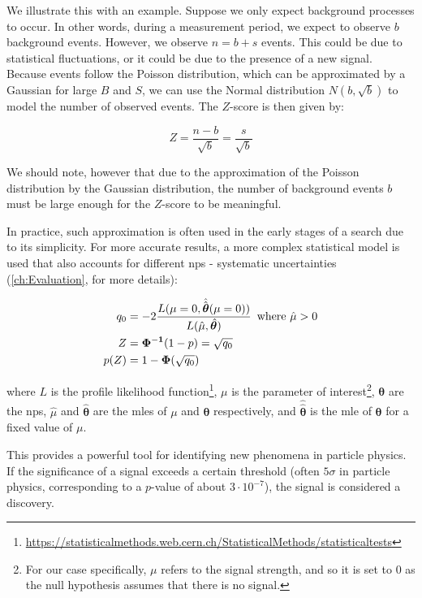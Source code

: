 We illustrate this with an example. Suppose we only expect background processes to occur. In other words, during a
measurement period, we expect to observe $b$ background events. However, we observe $n=b+s$ events. This
could be due to statistical fluctuations, or it could be due to the presence of a new signal. Because events follow the
Poisson distribution, which can be approximated by a Gaussian for large $B$ and $S$, we can use the Normal distribution
$N(b, \sqrt{b})$ to model the number of observed events. The $Z$-score is then given by:

\begin{equation}
    Z = \frac{n-b}{\sqrt{b}} = \frac{s}{\sqrt{b}}
\end{equation}

We should note, however that due to the approximation of the Poisson distribution by the Gaussian distribution, the
number of background events $b$ must be large enough for the $Z$-score to be meaningful.

In practice, such approximation is often used in the early stages of a search due to its simplicity. For more accurate
results, a more complex statistical model is used that also accounts for different \glspl{np} - systematic
uncertainties (\autoref{ch:Evaluation}, \cite{pract-stat-lhc, statistical} for more details):

\begin{align}
    q_0  & = -2 \frac{L(\mu=0, \hat{\hat{\bm{\theta}}}(\mu=0))}{L(\hat{\mu}, \hat{\bm{\theta}})} \, \text{ where $\hat{\mu} > 0$} \\
    Z    & = \mathbf{\Phi^{-1}}(1 - p) = \sqrt{q_0}                                                                                          \\
    p(Z) & = 1 - \mathbf{\Phi}(\sqrt{q_0})
\end{align}

where $L$ is the profile likelihood
function\footnote{\url{https://statisticalmethods.web.cern.ch/StatisticalMethods/statisticaltests}}, $\mu$ is the
parameter of interest\footnote{For our case specifically, $\mu$ refers to the signal strength, and so it is set to $0$
    as the null hypothesis assumes that there is no signal.}, $\bm{\theta}$ are the \glspl{np}, $\hat{\mu}$ and
$\hat{\bm{\theta}}$ are the \glspl{mle} of $\mu$ and $\bm{\theta}$ respectively, and $\hat{\hat{\bm{\theta}}}$ is the
\gls{mle} of $\bm{\theta}$ for a fixed value of $\mu$.

This provides a powerful tool for identifying new phenomena in particle physics. If the significance of a signal exceeds
a certain threshold (often $5\sigma$ in particle physics, corresponding to a $p$-value of about $3\cdot10^{-7}$), the
signal is considered a discovery.